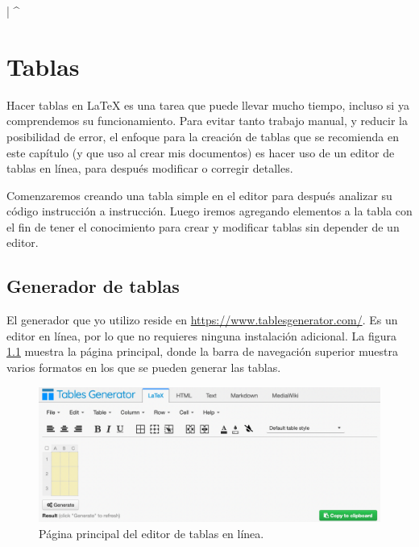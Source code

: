 \lstDeleteShortInline|
\lstMakeShortInline[style=latexi]^

\chapter{Tablas}
\label{cha:tablas}



Hacer tablas en \LaTeX{} es una tarea que puede llevar mucho tiempo, incluso si ya comprendemos su funcionamiento. Para evitar tanto trabajo manual, y reducir la posibilidad de error, el enfoque para la creación de tablas que se recomienda en este capítulo (y que uso al crear mis documentos) es hacer uso de un editor de tablas en línea, para después modificar o corregir detalles.

Comenzaremos creando una tabla simple en el editor para después analizar su código instrucción a instrucción. Luego iremos agregando elementos a la tabla con el fin de tener el conocimiento para crear y modificar tablas sin depender de un editor.



\section{Generador de tablas}
\label{sec:generador_de_tablas}



El generador que yo utilizo reside en \href{https://www.tablesgenerator.com/}{https://www.tablesgenerator.com/}. Es un editor en línea, por lo que no requieres ninguna instalación adicional. La figura \ref{fig:table_editor} muestra la página principal, donde la barra de navegación superior muestra varios formatos en los que se pueden generar las tablas.

\begin{figure}[ht!]
	\centering
	\includegraphics[width=\linewidth]{img/table_editor_300ppi.png}
	\caption{Página principal del editor de tablas en línea.}
	\label{fig:table_editor}
\end{figure}

